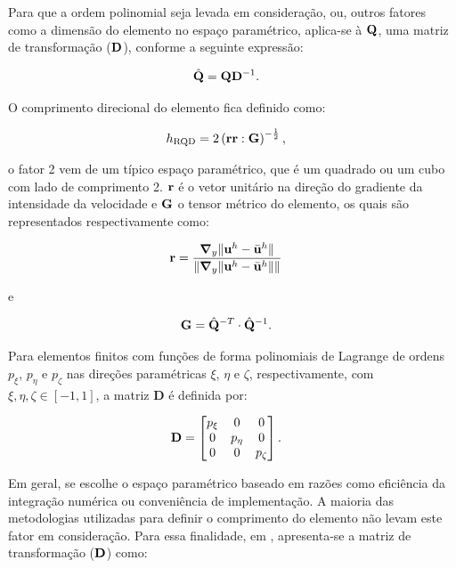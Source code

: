 Para que a ordem polinomial seja levada em consideração, ou, outros fatores como a dimensão do elemento no espaço paramétrico, aplica-se à $\mathbf{Q}$, uma matriz de transformação ($\mathbf{D}$), conforme a seguinte expressão:

\begin{align}
	\hat{\mathbf{Q}}&=\mathbf{Q}\mathbf{D}^{-1} \label{eq:q_chap}.
\end{align}

O comprimento direcional do elemento fica definido como:

\begin{align}
	h_{\mathrm{RQD}} &=2\left(\mathbf{r}\mathbf{r} : \mathbf{G} \right)^{-\frac{1}{2}},
\end{align}

\noindent o fator 2 vem de um típico espaço paramétrico, que é um quadrado ou um cubo com lado de comprimento 2. $\mathbf{r}$ é o vetor unitário na direção do gradiente da intensidade da velocidade e $\mathbf{G}$ o tensor métrico do elemento, os quais são representados respectivamente como:

\begin{align}
	\mathbf{r}&=\frac{\boldsymbol{\nabla}_y \lVert\mathbf{u}^h - \bar{\mathbf{u}}^h\rVert}{\lVert \boldsymbol{\nabla}_y \lVert\mathbf{u}^h - \bar{\mathbf{u}}^h\rVert\rVert} \label{eq:rRGN}
\end{align}

\noindent e

\begin{align}
	\mathbf{G} &= \hat{\mathbf{Q}}^{-T} \cdot \hat{\mathbf{Q}}^{-1}. \label{eq:tensor_metrico}
\end{align}

Para elementos finitos com funções de forma polinomiais de Lagrange de ordens $p_\xi$, $p_\eta$ e $p_\zeta$ nas direções paramétricas $\xi$, $\eta$ e $\zeta$, respectivamente, com $\xi, \eta, \zeta \in [-1, 1]$, a matriz $\mathbf{D}$ é definida por:

\begin{align}
	\mathbf{D}&=\begin{bmatrix}
		p_{\xi} & 0 & 0\\
		0 & p_{\eta} & 0 \\
		0 & 0 & p_{\zeta}
	\end{bmatrix}.
\end{align}

Em geral, se escolhe o espaço paramétrico baseado em razões como eficiência da integração numérica ou conveniência de implementação. A maioria das metodologias utilizadas para definir o comprimento do elemento não levam este fator em consideração. Para essa finalidade, em , apresenta-se a matriz de transformação ($\mathbf{D}$) como:

